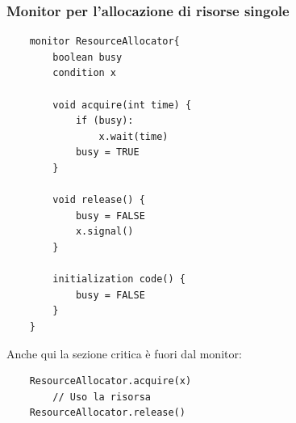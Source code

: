 \subsubsection{Monitor per l'allocazione di risorse singole}
\begin{verbatim}
    monitor ResourceAllocator{
        boolean busy
        condition x

        void acquire(int time) {
            if (busy):
                x.wait(time)
            busy = TRUE
        }

        void release() {
            busy = FALSE
            x.signal()
        }

        initialization code() {
            busy = FALSE
        }
    }
\end{verbatim}
Anche qui la sezione critica è fuori dal monitor:
\begin{verbatim}
    ResourceAllocator.acquire(x)
        // Uso la risorsa
    ResourceAllocator.release()
\end{verbatim}
